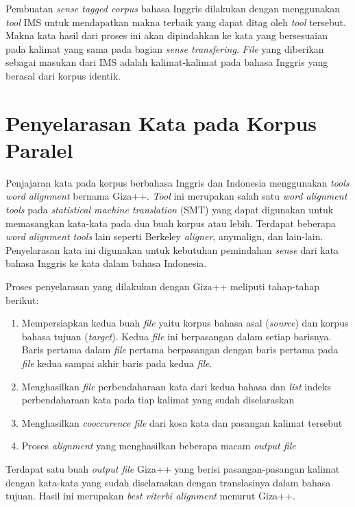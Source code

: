 Pembuatan \textit{sense tagged corpus} bahasa Inggris dilakukan dengan menggunakan \textit{tool} IMS untuk mendapatkan makna terbaik yang dapat ditag oleh \textit{tool} tersebut. Makna kata hasil dari proses ini akan dipindahkan ke kata yang bersesuaian pada kalimat yang sama pada bagian \textit{sense transfering}. \textit{File} yang diberikan sebagai masukan dari IMS adalah kalimat-kalimat pada bahasa Inggris yang berasal dari korpus identik.
\section{Penyelarasan Kata pada Korpus Paralel}
Penjajaran kata pada korpus berbahasa Inggris dan Indonesia menggunakan \textit{tools word alignment} bernama Giza++. \textit{Tool} ini merupakan salah satu \textit{word alignment tools} pada \textit{statistical machine translation} (SMT) yang dapat digunakan untuk memasangkan kata-kata pada dua buah korpus atau lebih. Terdapat beberapa \textit{word alignment tools} lain seperti Berkeley \textit{aligner}, anymalign, dan lain-lain. Penyelarasan kata ini digunakan untuk kebutuhan pemindahan \textit{sense} dari kata bahasa Inggris ke kata dalam bahasa Indonesia.

Proses penyelarasan yang dilakukan dengan Giza++ meliputi tahap-tahap berikut:
\begin{enumerate}
	\item Mempersiapkan kedua buah \textit{file} yaitu korpus bahasa asal (\textit{source}) dan korpus bahasa tujuan (\textit{target}). Kedua \textit{file} ini berpasangan dalam setiap barisnya. Baris pertama dalam \textit{file} pertama berpasangan dengan baris pertama pada \textit{file} kedua sampai akhir baris pada kedua \textit{file}.
	\item Menghasilkan \textit{file} perbendaharaan kata dari kedua bahasa dan \textit{list} indeks perbendaharaan kata pada tiap kalimat yang sudah diselaraskan
	\item Menghasilkan \textit{cooccurence file} dari kosa kata dan pasangan kalimat tersebut
	\item Proses \textit{alignment} yang menghasilkan beberapa macam \textit{output file} 
\end{enumerate}

Terdapat satu buah \textit{output file} Giza++ yang berisi pasangan-pasangan kalimat dengan kata-kata yang sudah diselaraskan dengan translasinya dalam bahasa tujuan. Hasil ini merupakan \textit{best viterbi alignment} menurut Giza++.

